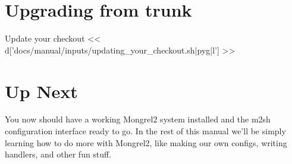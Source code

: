\section{Upgrading from trunk}
\begin{code}{Update your checkout}
<< d['docs/manual/inputs/updating_your_checkout.sh|pyg|l'] >>
\end{code}



\section{Up Next}

You now should have a working Mongrel2 system installed and the m2sh configuration
interface ready to go.  In the rest of this manual we'll be simply learning how
to do more with Mongrel2, like making our own configs, writing handlers, and other
fun stuff.

